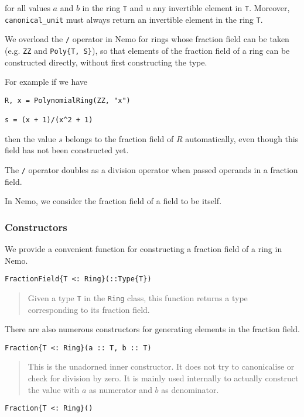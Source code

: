 \documentclass[a4paper,10pt]{article}
\newcommand{\code}{\lstinline}
\newcommand{\desc}[1]{\vspace{-3mm}\begin{quote}#1\end{quote}}
\begin{document}
{{for all values $a$ and $b$ in the ring \code{T} and $u$ any invertible element
in \code{T}. Moreover, \code{canonical_unit} must always return an invertible
element in the ring \code{T}.

We overload the \code{/} operator in Nemo for rings whose fraction field can
be taken (e.g. \code{ZZ} and \code|Poly{T, S}|), so that elements of the
fraction field of a ring can be constructed directly, without first
constructing the type.

For example if we have

\begin{lstlisting}
R, x = PolynomialRing(ZZ, "x")

s = (x + 1)/(x^2 + 1)
\end{lstlisting}

then the value $s$ belongs to the fraction field of $R$ automatically, even
though this field has not been constructed yet.

The \code{/} operator doubles as a division operator when passed operands
in a fraction field.

In Nemo, we consider the fraction field of a field to be itself.

\subsubsection{Constructors}

We provide a convenient function for constructing a fraction field of a ring in
Nemo.

\begin{lstlisting}
FractionField{T <: Ring}(::Type{T})
\end{lstlisting}

\desc{Given a type \code{T} in the \code{Ring} class, this function returns a
type corresponding to its fraction field.}

There are also numerous constructors for generating elements in the fraction
field.

\begin{lstlisting}
Fraction{T <: Ring}(a :: T, b :: T)
\end{lstlisting}

\desc{This is the unadorned inner constructor. It does not try to canonicalise
or check for division by zero. It is mainly used internally to actually 
construct the value with $a$ as numerator and $b$ as denominator.}

\begin{lstlisting}
Fraction{T <: Ring}()
\end{lstlisting}

}}
\end{document}
